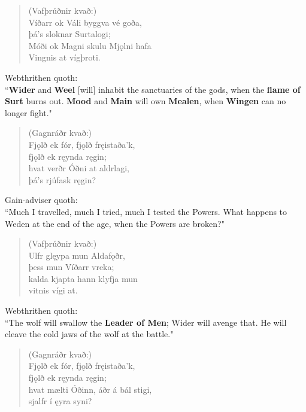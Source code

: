 \begin{verse}
(Vafþrúðnir kvað:) \\%
\bva Víðarr ok Váli \hld byggva vé goða, \\%
\ind þá's sloknar Surtalogi; \\%
Móði ok Magni \hld skulu Mjǫlni hafa \\%
\ind Vingnis at vígþroti.\\%
\end{verse}

\bvb Webthrithen quoth: \\ “\textbf{Wider} and \textbf{Weel} [will] inhabit the sanctuaries of the gods, when the \textbf{flame of Surt} burns out. \textbf{Mood} and \textbf{Main} will own \textbf{Mealen}, when \textbf{Wingen} can no longer fight\footnotemark[110]." \\

\begin{verse}
(Gagnráðr kvað:) \\%
\bva Fjǫlð ek fór, \hld fjǫlð fręistaða'k, \\%
\ind fjǫlð ek ręynda ręgin; \\%
hvat verðr Óðni \hld at aldrlagi, \\%
\ind þá's rjúfask ręgin?\\%
\end{verse}

\bvb Gain-adviser quoth: \\ “Much I travelled, much I tried, much I tested the Powers. What happens to Weden at the end of the age, when the Powers are broken?" \\

\begin{verse}
(Vafþrúðnir kvað:) \\%
\bva Ulfr glęypa \hld mun Aldafǫðr, \\%
\ind þess mun Víðarr vreka; \\%
kalda kjapta \hld hann klyfja mun \\%
\ind vitnis vígi at.\\%
\end{verse}

\bvb Webthrithen quoth: \\ “The wolf will swallow the \textbf{Leader of Men}; Wider will avenge that. He will cleave the cold jaws of the wolf at the battle." \\

\begin{verse}
(Gagnráðr kvað:) \\%
\bva Fjǫlð ek fór, \hld fjǫlð fręistaða'k, \\%
\ind fjǫlð ek ręynda ręgin; \\%
hvat mælti Óðinn, \hld áðr á bál stigi, \\%
\ind sjalfr í ęyra syni?\\%
\end{verse}

